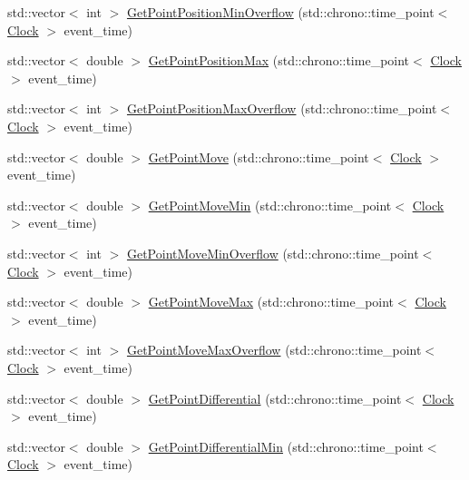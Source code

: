 \begin{DoxyCompactItemize}
\item 
std\+::vector$<$ int $>$ \hyperlink{class_point_a3a0caf079555585799754b3cab12129c}{Get\+Point\+Position\+Min\+Overflow} (std\+::chrono\+::time\+\_\+point$<$ \hyperlink{universe_8h_a0ef8d951d1ca5ab3cfaf7ab4c7a6fd80}{Clock} $>$ event\+\_\+time)
\item 
std\+::vector$<$ double $>$ \hyperlink{class_point_afca47c5ea265894faf7b6aa4f4b17998}{Get\+Point\+Position\+Max} (std\+::chrono\+::time\+\_\+point$<$ \hyperlink{universe_8h_a0ef8d951d1ca5ab3cfaf7ab4c7a6fd80}{Clock} $>$ event\+\_\+time)
\item 
std\+::vector$<$ int $>$ \hyperlink{class_point_a228830fddb8b4d90e910e0774796e635}{Get\+Point\+Position\+Max\+Overflow} (std\+::chrono\+::time\+\_\+point$<$ \hyperlink{universe_8h_a0ef8d951d1ca5ab3cfaf7ab4c7a6fd80}{Clock} $>$ event\+\_\+time)
\item 
std\+::vector$<$ double $>$ \hyperlink{class_point_a46d06a6d5e8107a0321ede4ca162f264}{Get\+Point\+Move} (std\+::chrono\+::time\+\_\+point$<$ \hyperlink{universe_8h_a0ef8d951d1ca5ab3cfaf7ab4c7a6fd80}{Clock} $>$ event\+\_\+time)
\item 
std\+::vector$<$ double $>$ \hyperlink{class_point_a92d41c8cd9a07ef56223839a44f54fe8}{Get\+Point\+Move\+Min} (std\+::chrono\+::time\+\_\+point$<$ \hyperlink{universe_8h_a0ef8d951d1ca5ab3cfaf7ab4c7a6fd80}{Clock} $>$ event\+\_\+time)
\item 
std\+::vector$<$ int $>$ \hyperlink{class_point_a3c88bb9f80535e98fb0f479b69f75c64}{Get\+Point\+Move\+Min\+Overflow} (std\+::chrono\+::time\+\_\+point$<$ \hyperlink{universe_8h_a0ef8d951d1ca5ab3cfaf7ab4c7a6fd80}{Clock} $>$ event\+\_\+time)
\item 
std\+::vector$<$ double $>$ \hyperlink{class_point_af67ce3da60a8e3907df6ec193786c2ae}{Get\+Point\+Move\+Max} (std\+::chrono\+::time\+\_\+point$<$ \hyperlink{universe_8h_a0ef8d951d1ca5ab3cfaf7ab4c7a6fd80}{Clock} $>$ event\+\_\+time)
\item 
std\+::vector$<$ int $>$ \hyperlink{class_point_a83e3715d429ab2099f0c421d46603004}{Get\+Point\+Move\+Max\+Overflow} (std\+::chrono\+::time\+\_\+point$<$ \hyperlink{universe_8h_a0ef8d951d1ca5ab3cfaf7ab4c7a6fd80}{Clock} $>$ event\+\_\+time)
\item 
std\+::vector$<$ double $>$ \hyperlink{class_point_af3941d62b39234e468e201f25a37d9da}{Get\+Point\+Differential} (std\+::chrono\+::time\+\_\+point$<$ \hyperlink{universe_8h_a0ef8d951d1ca5ab3cfaf7ab4c7a6fd80}{Clock} $>$ event\+\_\+time)
\item 
std\+::vector$<$ double $>$ \hyperlink{class_point_a782860849006b601600f8df15af23f7a}{Get\+Point\+Differential\+Min} (std\+::chrono\+::time\+\_\+point$<$ \hyperlink{universe_8h_a0ef8d951d1ca5ab3cfaf7ab4c7a6fd80}{Clock} $>$ event\+\_\+time)

\end{DoxyCompactItemize}
